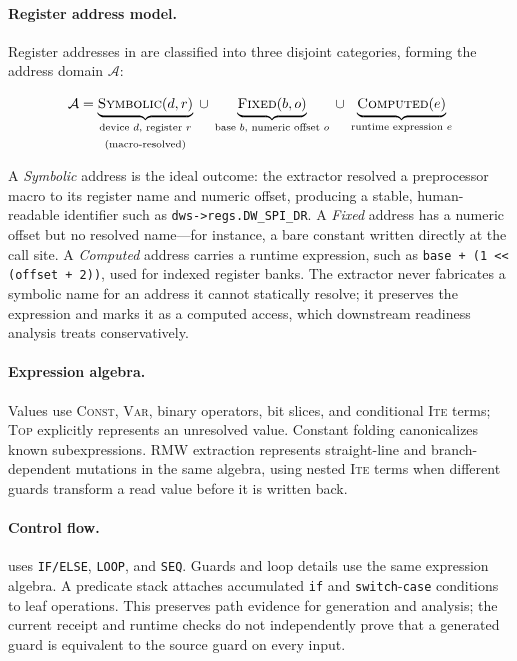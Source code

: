 \paragraph{Register address model.}

Register addresses in \rislang{} are classified into three disjoint categories, forming the address domain $\mathcal{A}$:

\[
\mathcal{A} = \underbrace{\textsc{Symbolic}(d, r)}_{\substack{\text{device $d$, register $r$} \\\\ \text{(macro-resolved)}}} \;\cup\; \underbrace{\textsc{Fixed}(b, o)}_{\substack{\text{base $b$, numeric offset $o$}}} \;\cup\; \underbrace{\textsc{Computed}(e)}_{\substack{\text{runtime expression $e$}}}
\]

A \emph{Symbolic} address is the ideal outcome: the extractor resolved a preprocessor macro to its register name and numeric offset, producing a stable, human-readable identifier such as \texttt{dws->regs.DW\_SPI\_DR}. A \emph{Fixed} address has a numeric offset but no resolved name---for instance, a bare constant written directly at the call site. A \emph{Computed} address carries a runtime expression, such as \texttt{base + (1 << (offset + 2))}, used for indexed register banks. The extractor never fabricates a symbolic name for an address it cannot statically resolve; it preserves the expression and marks it as a computed access, which downstream readiness analysis treats conservatively.

\paragraph{Expression algebra.}

Values use \textsc{Const}, \textsc{Var}, binary operators, bit slices, and conditional \textsc{Ite} terms; \textsc{Top} explicitly represents an unresolved value. Constant folding canonicalizes known subexpressions. RMW extraction represents straight-line and branch-dependent mutations in the same algebra, using nested \textsc{Ite} terms when different guards transform a read value before it is written back.

\paragraph{Control flow.}

\rislang{} uses \texttt{IF/ELSE}, \texttt{LOOP}, and \texttt{SEQ}. Guards and
loop details use the same expression algebra. A predicate stack attaches
accumulated \texttt{if} and \texttt{switch}-\texttt{case} conditions to leaf
operations. This preserves path evidence for generation and analysis; the
current receipt and runtime checks do not independently prove that a generated
guard is equivalent to the source guard on every input.

